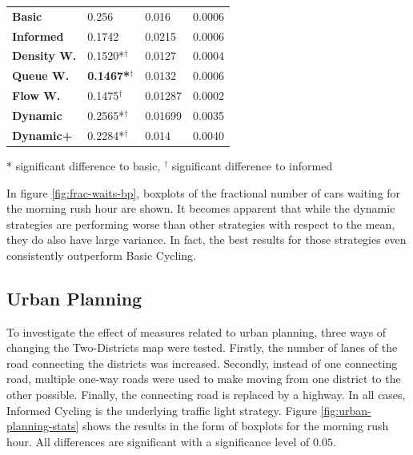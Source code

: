 \documentclass[11pt]{article}
\begin{document}
\begin{table}[H]
\begin{tabular}{l|l|l|l|}
\hline\textbf{Basic}      & 0.256           & 0.016             & 0.0006                     \\
\textbf{Informed}   & 0.1742          & 0.0215            & 0.0006                     \\
\hline\textbf{Density W.} & 0.1520*$^\dagger$          & 0.0127            & 0.0004                     \\
\textbf{Queue W.}   & \textbf{0.1467*$^\dagger$} & 0.0132            & 0.0006                     \\
\textbf{Flow W.}    & 0.1475$^\dagger$          & 0.01287           & 0.0002                     \\
\textbf{Dynamic}    & 0.2565*$^\dagger$          & 0.01699           & 0.0035                     \\
\textbf{Dynamic+}   & 0.2284*$^\dagger$          & 0.014             & 0.0040                    
\end{tabular}

\small{* significant difference to basic, $^\dagger$ significant difference to informed}
\end{table}

\vspace{20pt}

In figure \ref{fig:frac-waits-bp}, boxplots of the fractional number of cars waiting for the morning rush hour are shown. It becomes apparent that while the dynamic strategies are performing worse than other strategies with respect to the mean, they do also have large variance. In fact, the best results for those strategies even consistently outperform Basic Cycling.

\subsection{Urban Planning}
To investigate the effect of measures related to urban planning, three ways of changing the Two-Districts map were tested. Firstly, the number of lanes of the road connecting the districts was increased. Secondly, instead of one connecting road, multiple one-way roads were used to make moving from one district to the other possible. Finally, the connecting road is replaced by a highway. In all cases, Informed Cycling is the underlying traffic light strategy. Figure \ref{fig:urban-planning-stats} shows the results in the form of boxplots for the morning rush hour. All differences are significant with a significance level of $0.05$.
\end{document}
